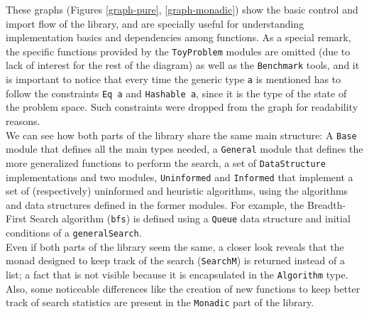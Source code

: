 These graphs (Figures \ref{graph-pure}, \ref{graph-monadic}) show the basic
control and import flow of the library, and are specially useful for
understanding implementation basics and dependencies among functions. As a
special remark, the specific functions provided by the \texttt{ToyProblem}
modules are omitted (due to lack of interest for the rest of the diagram) as
well as the \texttt{Benchmark} tools, and it is important to notice that every
time the generic type \texttt{a} is mentioned has to follow the constraints
\texttt{Eq a} and \texttt{Hashable a}, since it is the type of the state of the
problem space. Such constraints were dropped from the graph for readability
reasons.\\

We can see how both parts of the library share the same main structure: A
\texttt{Base} module that defines all the main types needed, a \texttt{General}
module that defines the more generalized functions to perform the search, a set
of \texttt{DataStructure} implementations and two modules, \texttt{Uninformed}
and \texttt{Informed} that implement a set of (respectively) uninformed and
heuristic algorithms, using the algorithms and data structures defined in the
former modules. For example, the Breadth-First Search algorithm (\texttt{bfs})
is defined using a \texttt{Queue} data structure and initial conditions of a
\texttt{generalSearch}.\\

Even if both parts of the library seem the same, a closer look reveals that the
monad designed to keep track of the search (\texttt{SearchM}) is returned
instead of a list; a fact that is not visible because it is encapsulated in the
\texttt{Algorithm} type. Also, some noticeable differences like the creation of
new functions to keep better track of search statistics are present in the
\texttt{Monadic} part of the library.\\


\newpage

\newcommand*\rot{\rotatebox{90}}


